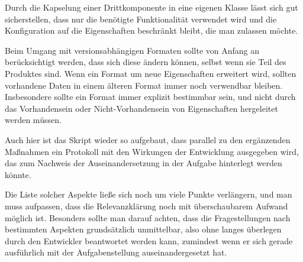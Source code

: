 Durch die Kapselung einer Drittkomponente in eine eigenen Klasse lässt sich gut sicherstellen, dass nur die benötigte Funktionalität verwendet wird und die Konfiguration auf die Eigenschaften beschränkt bleibt, die man zulassen möchte.

Beim Umgang mit versionsabhängigen Formaten sollte von Anfang an berücksichtigt werden, dass sich diese ändern können, selbst wenn sie Teil des Produktes sind. Wenn ein Format um neue Eigenschaften erweitert wird, sollten vorhandene Daten in einem älteren Format immer noch verwendbar bleiben. Insbesondere sollte ein Format immer explizit bestimmbar sein, und nicht durch das Vorhandensein oder Nicht-Vorhandensein von Eigenschaften hergeleitet werden müssen.

Auch hier ist das Skript wieder so aufgebaut, dass parallel zu den ergänzenden Maßnahmen ein Protokoll mit den Wirkungen der Entwicklung ausgegeben wird, das zum Nachweis der Auseinandersetzung in der Aufgabe hinterlegt werden könnte.

Die Liste solcher Aspekte ließe sich noch um viele Punkte verlängern, und man muss aufpassen, dass die Relevanzklärung noch mit überschaubarem Aufwand möglich ist. Besonders sollte man darauf achten, dass die Fragestellungen nach bestimmten Aspekten grundsätzlich unmittelbar, also ohne langes überlegen durch den Entwickler beantwortet werden kann, zumindest wenn er sich gerade ausführlich mit der Aufgabenstellung auseinandergesetzt hat.

